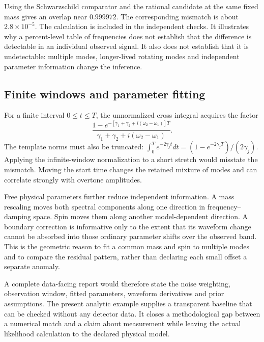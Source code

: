 Using the Schwarzschild comparator and the rational candidate at the same fixed mass gives an overlap near $0.999972$. The corresponding mismatch is about $2.8\times10^{-5}$. The calculation is included in the independent checks. It illustrates why a percent-level table of frequencies does not establish that the difference is detectable in an individual observed signal. It also does not establish that it is undetectable: multiple modes, longer-lived rotating modes and independent parameter information change the inference.

\subsection{Finite windows and parameter fitting}
For a finite interval $0\leq t\leq T$, the unnormalized cross integral acquires the factor
\begin{equation}
 \frac{1-e^{-[\gamma_1+\gamma_2+i(\omega_2-\omega_1)]T}}
 {\gamma_1+\gamma_2+i(\omega_2-\omega_1)}.
 \label{c11:finiteoverlap}
\end{equation}
The template norms must also be truncated: $\int_0^T e^{-2\gamma_jt}dt=(1-e^{-2\gamma_jT})/(2\gamma_j)$. Applying the infinite-window normalization to a short stretch would misstate the mismatch. Moving the start time changes the retained mixture of modes and can correlate strongly with overtone amplitudes.

Free physical parameters further reduce independent information. A mass rescaling moves both spectral components along one direction in frequency--damping space. Spin moves them along another model-dependent direction. A boundary correction is informative only to the extent that its waveform change cannot be absorbed into those ordinary parameter shifts over the observed band. This is the geometric reason to fit a common mass and spin to multiple modes and to compare the residual pattern, rather than declaring each small offset a separate anomaly.

A complete data-facing report would therefore state the noise weighting, observation window, fitted parameters, waveform derivatives and prior assumptions. The present analytic example supplies a transparent baseline that can be checked without any detector data. It closes a methodological gap between a numerical match and a claim about measurement while leaving the actual likelihood calculation to the declared physical model.

